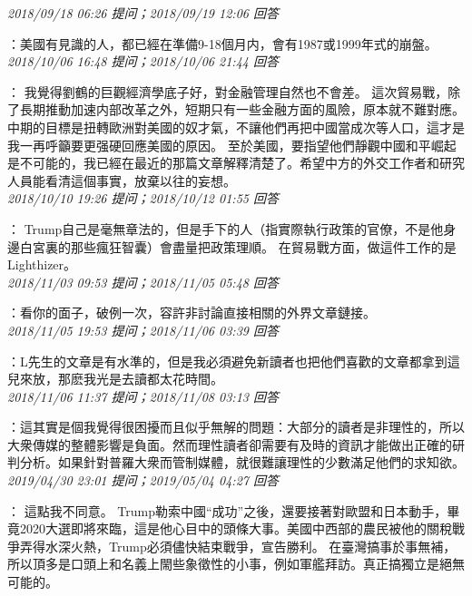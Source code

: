 \documentclass[twocolumn]{ctexart}
\begin{document}
\textit{\hfill\noindent\small 2018/09/18 06:26 提问；2018/09/19 12:06 回答}

：美國有見識的人，都已經在準備9-18個月内，會有1987或1999年式的崩盤。
\\

\textit{\hfill\noindent\small 2018/10/06 16:48 提问；2018/10/06 21:44 回答}

：
我覺得劉鶴的巨觀經濟學底子好，對金融管理自然也不會差。
這次貿易戰，除了長期推動加速内部改革之外，短期只有一些金融方面的風險，原本就不難對應。中期的目標是扭轉歐洲對美國的奴才氣，不讓他們再把中國當成次等人口，這才是我一再呼籲要更强硬回應美國的原因。
至於美國，要指望他們靜觀中國和平崛起是不可能的，我已經在最近的那篇文章解釋清楚了。希望中方的外交工作者和研究人員能看清這個事實，放棄以往的妄想。
\\

\textit{\hfill\noindent\small 2018/10/10 19:26 提问；2018/10/12 01:55 回答}

：
Trump自己是毫無章法的，但是手下的人（指實際執行政策的官僚，不是他身邊白宮裏的那些瘋狂智囊）會盡量把政策理順。
在貿易戰方面，做這件工作的是Lighthizer。
\\

\textit{\hfill\noindent\small 2018/11/03 09:53 提问；2018/11/05 05:48 回答}

：看你的面子，破例一次，容許非討論直接相關的外界文章鏈接。
\\

\textit{\hfill\noindent\small 2018/11/05 19:53 提问；2018/11/06 03:39 回答}

：L先生的文章是有水準的，但是我必須避免新讀者也把他們喜歡的文章都拿到這兒來放，那麽我光是去讀都太花時間。
\\

\textit{\hfill\noindent\small 2018/11/06 11:37 提问；2018/11/08 03:13 回答}

：這其實是個我覺得很困擾而且似乎無解的問題：大部分的讀者是非理性的，所以大衆傳媒的整體影響是負面。然而理性讀者卻需要有及時的資訊才能做出正確的研判分析。如果針對普羅大衆而管制媒體，就很難讓理性的少數滿足他們的求知欲。
\\

\textit{\hfill\noindent\small 2019/04/30 23:01 提问；2019/05/04 04:27 回答}

：
這點我不同意。 
Trump勒索中國“成功”之後，還要接著對歐盟和日本動手，畢竟2020大選即將來臨，這是他心目中的頭條大事。美國中西部的農民被他的關稅戰爭弄得水深火熱，Trump必須儘快結束戰爭，宣告勝利。 
在臺灣搞事於事無補，所以頂多是口頭上和名義上閙些象徵性的小事，例如軍艦拜訪。真正搞獨立是絕無可能的。
\\
\end{document}
